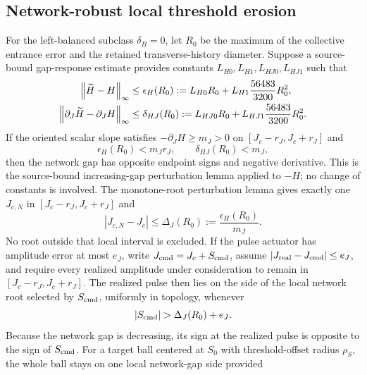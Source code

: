 \subsection{Network-robust local threshold erosion}

For the left-balanced subclass \(\delta_B=0\), let \(R_0\) be the maximum
of the collective entrance error and the retained transverse-history
diameter.  Suppose a source-bound gap-response estimate provides constants
\(L_{H0},L_{H1},L_{HJ0},L_{HJ1}\) such that
\begin{align}
 \left\lVert\widetilde H-H\right\rVert_\infty
 &\le\epsilon_H(R_0)
 :=L_{H0}R_0+L_{H1}\frac{56483}{3200}R_0^2,\notag\\
 \left\lVert\partial_J\widetilde H-\partial_JH\right\rVert_\infty
 &\le\delta_{HJ}(R_0)
 :=L_{HJ0}R_0+L_{HJ1}\frac{56483}{3200}R_0^2.          \label{eq:gap-response}
\end{align}
If the oriented scalar slope satisfies \(-\partial_JH\ge m_J>0\) on
\([J_c-r_J,J_c+r_J]\) and
\begin{equation}
 \epsilon_H(R_0)<m_Jr_J,
 \qquad \delta_{HJ}(R_0)<m_J,                         \label{eq:network-root-gates}
\end{equation}
then the network gap has opposite endpoint signs and negative derivative.
This is the source-bound increasing-gap perturbation lemma applied to
\(-H\); no change of constants is involved.
The monotone-root perturbation lemma gives exactly one \(J_{c,N}\) in
\([J_c-r_J,J_c+r_J]\) and
\begin{equation}
 |J_{c,N}-J_c|\le\Delta_J(R_0)
 :=\frac{\epsilon_H(R_0)}{m_J}.                        \label{eq:threshold-erosion}
\end{equation}
No root outside that local interval is excluded.  If the pulse actuator has
amplitude error at most \(e_J\), write
\(J_{\rm cmd}=J_c+S_{\rm cmd}\), assume
\(\left\lvert J_{\rm real}-J_{\rm cmd}\right\rvert\le e_J\), and require every realized
amplitude under consideration to remain in \([J_c-r_J,J_c+r_J]\).  The
realized pulse then lies on the side of the local network root selected by
\(S_{\rm cmd}\), uniformly in topology, whenever
\begin{equation}
 |S_{\rm cmd}|>\Delta_J(R_0)+e_J.                     \label{eq:safety-guard}
\end{equation}
Because the network gap is decreasing, its sign at the realized pulse is
opposite to the sign of \(S_{\rm cmd}\).  For a target ball centered at
\(S_0\) with
threshold-offset radius \(\rho_S\), the whole ball stays on one local
network-gap side provided
